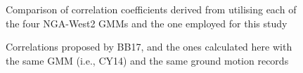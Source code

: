 \documentclass[12pt,a4paper,twoside, openright]{report}
\begin{document}
	\begin{figure}
		\centering
		
		\caption{Comparison of correlation coefficients derived from utilising each of the four \gls{NGA-West2} \glspl{GMM} and the one employed for this study}
		\label{Sa_Sa_total_correlation_comparison_slices_nga_west}
	\end{figure}
	
	\begin{figure}
		\centering
		
		\caption{Correlations proposed by BB17, and the ones calculated here with the same \gls{GMM} (i.e., CY14) and the same ground motion records}
		\label{Sa_Sa_total_correlation_comparison_slices_diff_filt}
	\end{figure}
	
	
\end{document}
